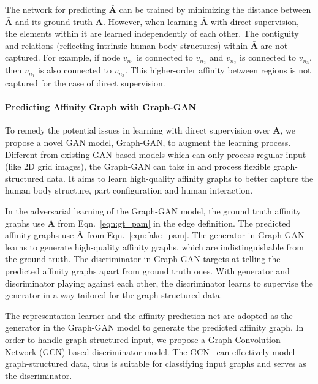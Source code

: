 \documentclass[10pt, letterpaper]{article}
\begin{document}
The network for predicting $\bar{\mathbf{A}}$ can be trained by minimizing the distance between $\bar{\mathbf{A}}$ and its ground truth $\mathbf{A}$. However, when learning $\bar{\mathbf{A}}$ with direct supervision, the elements within it are learned independently of each other. The contiguity and relations (reflecting intrinsic human body structures) within  $\bar{\mathbf{A}}$  are not captured. For example, if node $v_{n_1}$ is connected to $v_{n_2}$ and $v_{n_2}$ is connected to $v_{n_3}$, then $v_{n_1}$ is also connected to $v_{n_3}$. This higher-order affinity between regions is not captured for the case of direct supervision. 

\paragraph{Predicting Affinity Graph with Graph-GAN}
To remedy the potential issues in learning with direct supervision over $\mathbf{A}$, we propose a novel GAN model, Graph-GAN, to augment the learning process. Different from existing GAN-based models which can only process regular input (like 2D grid images), the Graph-GAN can take in and process flexible graph-structured data. It aims to learn high-quality affinity graphs to better capture the human body structure, part configuration and human interaction.  

In the adversarial learning of the Graph-GAN model, the ground truth  affinity graphs use $\mathbf{A}$ from Eqn.~\eqref{eqn:gt_pam} in the edge definition. The predicted  affinity graphs use  $\bar{\mathbf{A}}$ from Eqn.~\eqref{eqn:fake_pam}. The generator in Graph-GAN learns to generate high-quality affinity graphs, which are indistinguishable from the ground truth. The discriminator in Graph-GAN  targets at telling the predicted affinity graphs apart from ground truth ones. With generator and discriminator playing against each other, the discriminator learns to supervise the generator in a way tailored for the graph-structured data. 

The representation learner and the affinity prediction net are adopted as the generator in the Graph-GAN model to generate the predicted affinity graph. In order to handle graph-structured input, we propose a Graph Convolution Network (GCN) based discriminator model. The GCN~\cite{kipf2016semi,defferrard2016convolutional,manessi2017dynamic} can effectively model graph-structured data, thus is suitable for classifying input graphs and serves as the discriminator.  
\end{document}
